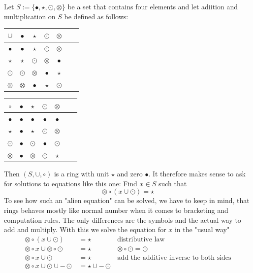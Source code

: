 \begin{example} Let $S:=\{\bullet,\star,\odot,\otimes\}$ be a set that contains four elements and let adiition and multiplication on $S$ be defined as follows:
\begin{center}
  \begin{tabular}{c | c c c c c c}
    $\cup$ & $\bullet$ & $\star$ & $\odot$ & $\otimes$ \\\hline
    $\bullet$ & $\bullet$ & $\star$ & $\odot$ & $\otimes$ \\
    $\star$ & $\star$ & $\odot$ & $\otimes$ & $\bullet$ \\
    $\odot$ & $\odot$ & $\otimes$ & $\bullet$ & $\star$ \\
    $\otimes$ & $\otimes$ & $\bullet$ & $\star$ & $\odot$ \\
  \end{tabular} \quad \quad \quad \quad
  \begin{tabular}{c | c c c c c c}
$ \circ $ & $\bullet$ & $\star$ & $\odot$ & $\otimes$ & \\\hline
        $\bullet$ & $\bullet$ & $\bullet$ & $\bullet$ & $\bullet$ &\\
        $\star$ & $\bullet$ & $\star$ & $\odot$ & $\otimes$ &\\
        $\odot$ & $\bullet$ & $\odot$ & $\bullet$ & $\odot$ &\\
        $\otimes$ & $\bullet$ & $\otimes$ & $\odot$ & $\star$ &\\
  \end{tabular}
\end{center}
Then $(S,\cup,\circ)$ is a ring with unit $\star$ and zero $\bullet$. It therefore makes sense to ask for solutions to equations like this one:
Find $x\in S$ such that
$$
\otimes \circ (x \cup \odot ) = \star
$$
To see how such an "alien equation" can be solved, we have to keep in mind, that rings behaves mostly like normal number when it comes to bracketing and computation rules. The only differences are the symbols and the actual way to add and multiply. With this we solve the equation for $x$ in the "usual way"
\begin{align*}
\otimes \circ (x \cup \odot ) &= \star & \text{distributive law}\\
\otimes \circ x \cup \otimes \circ \odot  &= \star & \otimes \circ \odot = \odot\\
\otimes \circ x \cup \odot  &= \star & \text{add the additive inverse to both sides}\\
\otimes \circ x \cup \odot \cup -\odot  &= \star \cup -\odot\\

\end{align*}
\end{example}
